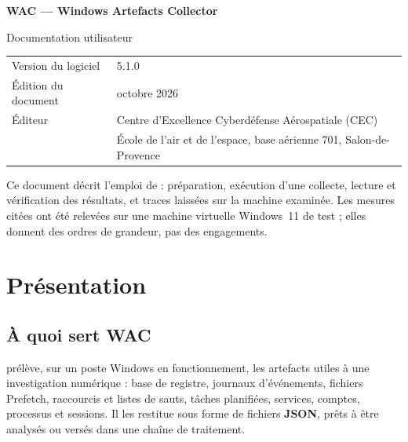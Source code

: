 \documentclass[11pt,a4paper,oneside]{report}
\begin{document}

\thispagestyle{empty}
\vspace*{\fill}
{\color{marine}\Large\bfseries WAC — Windows Artefacts Collector}\par
{\color{bleu}Documentation utilisateur}\par
\medskip
\begin{tabular}{@{}ll@{}}
Version du logiciel & 5.1.0 \\
Édition du document & octobre 2026 \\
Éditeur & Centre d'Excellence Cyberdéfense Aérospatiale (CEC) \\
        & École de l'air et de l'espace, base aérienne 701, Salon-de-Provence \\
\end{tabular}

\bigskip
{\small\color{gris}Ce document décrit l'emploi de \wac{} : préparation, exécution
d'une collecte, lecture et vérification des résultats, et traces laissées sur la
machine examinée. Les mesures citées ont été relevées sur une machine virtuelle
Windows~11 de test ; elles donnent des ordres de grandeur, pas des
engagements.}
\vspace*{2cm}
\clearpage

\tableofcontents

\chapter{Présentation}

\section{À quoi sert WAC}

\wac{} prélève, sur un poste Windows en fonctionnement, les artefacts utiles à
une investigation numérique : base de registre, journaux d'événements, fichiers
Prefetch, raccourcis et listes de sauts, tâches planifiées, services, comptes,
processus et sessions. Il les restitue sous forme de fichiers \textbf{JSON},
prêts à être analysés ou versés dans une chaîne de traitement.
\end{document}
